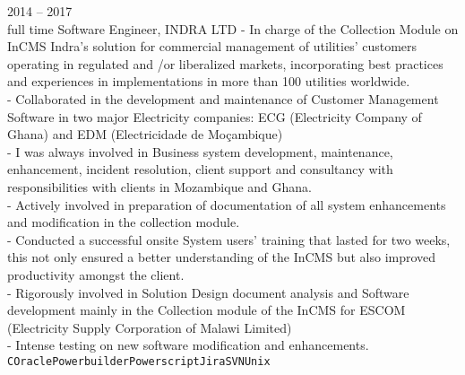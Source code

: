 \documentclass[9pt]{developercv} %
\begin{document}
\begin{entrylist}
	\entry
		{2014 -- 2017\\\footnotesize{full time}}
		{Software Engineer,}
		{INDRA LTD}
		{   - 	In charge of the Collection Module on InCMS Indra’s solution for commercial management of utilities’ customers operating in regulated and /or liberalized markets, incorporating best practices and experiences in implementations in more than 100 utilities worldwide.\\
			-  	Collaborated in the development and maintenance of Customer Management Software in two major Electricity companies: ECG (Electricity Company of Ghana) and EDM (Electricidade de Moçambique)\\
			- I was always involved in Business system development, maintenance, enhancement, incident resolution, client support and consultancy with responsibilities with clients in Mozambique and Ghana.\\
			- 	Actively involved in  preparation of documentation of all system enhancements and modification in the collection module.\\
			-  Conducted a successful onsite System users’ training that lasted for two weeks, this not only ensured a better understanding of the InCMS but also improved productivity amongst the client.\\
			- Rigorously involved in Solution Design document analysis and Software development mainly in the Collection module of the InCMS for ESCOM (Electricity Supply Corporation of Malawi Limited)\\
		   - 	Intense testing on new software modification and enhancements.\\
			\texttt{C}\slashsep\texttt{Oracle}\slashsep\texttt{Powerbuilder}\slashsep\texttt{Powerscript}\slashsep\texttt{Jira}\slashsep\texttt{SVN}\slashsep\texttt{Unix}}\\\\\\\\\\\\\\\\\\\\\\\\\\
\end{entrylist}

\end{document}
